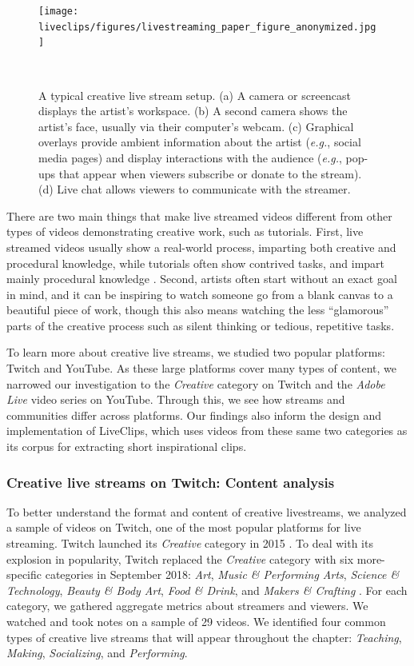 \begin{figure}[b!]
\centering
  \texttt{[image: liveclips/figures/livestreaming\_paper\_figure\_anonymized.jpg]}
  \caption[A typical creative live stream setup.]{A typical creative live stream setup. (a) A camera or screencast displays the artist's workspace. (b) A second camera shows the artist's face, usually via their computer's webcam. (c) Graphical overlays provide ambient information about the artist (\textit{e.g.}, social media pages) and display interactions with the audience (\textit{e.g.}, pop-ups that appear when viewers subscribe or donate to the stream). (d) Live chat allows viewers to communicate with the streamer. }~\label{fig:livestreaming_view}
\end{figure}

There are two main things that make live streamed videos different from other types of videos demonstrating creative work, such as tutorials. First, live streamed videos usually show a real-world process, imparting both creative and procedural knowledge, while tutorials often show contrived tasks, and impart mainly procedural knowledge \cite{Torrey2007}. Second, artists often start without an exact goal in mind, and it can be inspiring to watch someone go from a blank canvas to a beautiful piece of work, though this also means watching the less ``glamorous'' parts of the creative process such as silent thinking or tedious, repetitive tasks.

To learn more about creative live streams, we studied two popular platforms: Twitch and YouTube. As these large platforms cover many types of content, we narrowed our investigation to the \textit{Creative} category on Twitch and the \textit{Adobe Live} video series on YouTube. Through this, we see how streams and communities differ across platforms. Our findings also inform the design and implementation of LiveClips, which uses videos from these same two categories as its corpus for extracting short inspirational clips.

\subsubsection{Creative live streams on Twitch: Content analysis}
To better understand the format and content of creative live\-streams, we analyzed a sample of videos on Twitch, one of the most popular platforms for live streaming. Twitch launched its \textit{Creative} category in 2015 \cite{Moorier2015}. To deal with its explosion in popularity, Twitch replaced the \textit{Creative} category with six more-specific categories in September 2018: \textit{Art}, \textit{Music \& Performing Arts}, \textit{Science \& Technology}, \textit{Beauty \& Body Art}, \textit{Food \& Drink}, and \textit{Makers \& Crafting} \cite{Robertson2018}. For each category, we gathered aggregate metrics about streamers and viewers. We watched and took notes on a sample of 29 videos. We identified four common types of creative live streams that will appear throughout the chapter: \textit{Teaching}, \textit{Making}, \textit{Socializing}, and \textit{Performing}.

